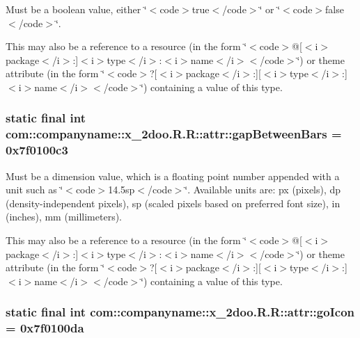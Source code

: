 Must be a boolean value, either \char`\"{}$<$code$>$true$<$/code$>$\char`\"{} or \char`\"{}$<$code$>$false$<$/code$>$\char`\"{}. 

This may also be a reference to a resource (in the form \char`\"{}$<$code$>$@\mbox{[}$<$i$>$package$<$/i$>$:\mbox{]}$<$i$>$type$<$/i$>$:$<$i$>$name$<$/i$>$$<$/code$>$\char`\"{}) or theme attribute (in the form \char`\"{}$<$code$>$?\mbox{[}$<$i$>$package$<$/i$>$:\mbox{]}\mbox{[}$<$i$>$type$<$/i$>$:\mbox{]}$<$i$>$name$<$/i$>$$<$/code$>$\char`\"{}) containing a value of this type. \hypertarget{classcom_1_1companyname_1_1x__2doo_1_1_r_1_1attr_211bb3d591a9d6756bae3983e3ef689d}{
\subsubsection[{gapBetweenBars}]{\setlength{\rightskip}{0pt plus 5cm}static final int com::companyname::x\_\-2doo.R.R::attr::gapBetweenBars = 0x7f0100c3}}
\label{classcom_1_1companyname_1_1x__2doo_1_1_r_1_1attr_211bb3d591a9d6756bae3983e3ef689d}


Must be a dimension value, which is a floating point number appended with a unit such as \char`\"{}$<$code$>$14.5sp$<$/code$>$\char`\"{}. Available units are: px (pixels), dp (density-independent pixels), sp (scaled pixels based on preferred font size), in (inches), mm (millimeters). 

This may also be a reference to a resource (in the form \char`\"{}$<$code$>$@\mbox{[}$<$i$>$package$<$/i$>$:\mbox{]}$<$i$>$type$<$/i$>$:$<$i$>$name$<$/i$>$$<$/code$>$\char`\"{}) or theme attribute (in the form \char`\"{}$<$code$>$?\mbox{[}$<$i$>$package$<$/i$>$:\mbox{]}\mbox{[}$<$i$>$type$<$/i$>$:\mbox{]}$<$i$>$name$<$/i$>$$<$/code$>$\char`\"{}) containing a value of this type. \hypertarget{classcom_1_1companyname_1_1x__2doo_1_1_r_1_1attr_a6435fee6878633e545bfd9b0b98340f}{
\subsubsection[{goIcon}]{\setlength{\rightskip}{0pt plus 5cm}static final int com::companyname::x\_\-2doo.R.R::attr::goIcon = 0x7f0100da}}
\label{classcom_1_1companyname_1_1x__2doo_1_1_r_1_1attr_a6435fee6878633e545bfd9b0b98340f}


